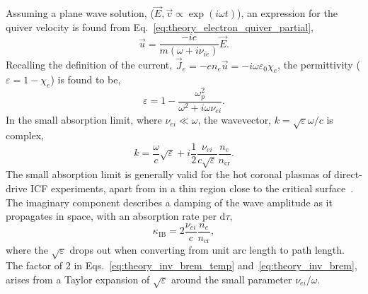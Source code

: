 Assuming a plane wave solution, ($\vec{E},\vec{v}\propto \exp{(i\omega t)}$), an expression for the quiver velocity is found from Eq.~\ref{eq:theory_electron_quiver_partial},
\begin{equation}
    \vec{u} = \frac{-ie}{m(\omega + i\nu_{ie})}\vec{E}.
\end{equation}
Recalling the definition of the current, $\vec{J}_e = -e n_e \vec{u} = -i\omega \varepsilon_0 \chi_e$, the permittivity ($\varepsilon = 1-\chi_e$) is found to be,
\begin{equation}
    \varepsilon = 1 - \frac{\omega_p^2}{\omega^2 + i \omega\nu_{ei}}.
\end{equation}
In the small absorption limit, where $\nu_{ei}\ll \omega$, the wavevector, $k = \sqrt{\varepsilon}\omega/c$ is complex,
\begin{equation}
    \label{eq:theory_inv_brem_temp}
    k = \frac{\omega}{c}\sqrt{\varepsilon} + i\frac{1}{2}\frac{\nu_{ei}}{c\sqrt{\varepsilon}}\frac{n_e}{n_{\text{cr}}}.
\end{equation}
The small absorption limit is generally valid for the hot coronal plasmas of direct-drive \ac{ICF} experiments, apart from in a thin region close to the critical surface~\cite{colaitis_real_2019}.
The imaginary component describes a damping of the wave amplitude as it propagates in space, with an absorption rate per $\text{d}\tau$,
\begin{equation}
    \label{eq:theory_inv_brem}
    \kappa_{\text{IB}} = 2 \frac{\nu_{ei}}{c}\frac{n_e}{n_{\text{cr}}},
\end{equation}
where the $\sqrt{\varepsilon}$ drops out when converting from unit arc length to path length.
The factor of 2 in Eqs.~\ref{eq:theory_inv_brem_temp} and~\ref{eq:theory_inv_brem}, arises from a Taylor expansion of $\sqrt{\varepsilon}$ around the small parameter $\nu_{ei}/\omega$.

